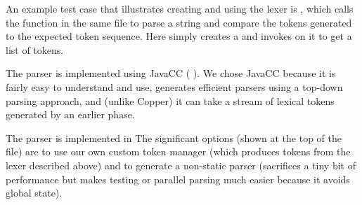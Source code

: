 \documentclass{article}
\begin{document}
\begin{mdP}[class={indent},data-line={108}]%
{}An example test case that illustrates creating and using the lexer is
{}%
{}, which calls the
{}%
{} function in the same file to parse a string and compare
the tokens generated to the expected token sequence.  Here %
{}%
{}
simply creates a %
{}%
{} and invokes %
{}%
{} on it to get a
list of tokens.%
\end{mdP}%
\begin{mdP}[data-line={118}]%
{}The parser is implemented using JavaCC
(%
{}%
{}).  We chose JavaCC because it is
fairly easy to understand and use, generates efficient parsers using
a top-down parsing approach, and (unlike Copper) it can take a stream
of lexical tokens generated by an earlier phase.%
\end{mdP}%
\begin{mdP}[class={indent},data-line={124}]%
{}The parser is implemented in
{}%
{}  The significant
options (shown at the top of the file) are to use our own custom
token manager (which produces tokens from the lexer described above)
and to generate a non-static parser (sacrifices a tiny bit of
performance but makes testing or parallel parsing much easier because
it avoids global state).%
\end{mdP}%
\end{document}

